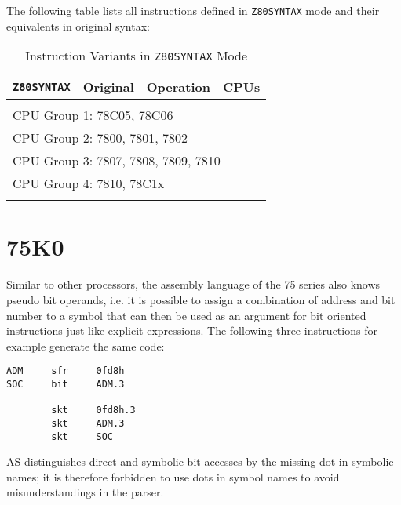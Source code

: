 \documentclass[12pt,twoside]{report}
\newcommand{\asname}{{AS}}
\begin{document}
The following table lists all instructions defined in {\tt Z80SYNTAX}
mode and their equivalents in original syntax:

\begin{longtable}{|l|l|l|l|}
\hline
{\tt Z80SYNTAX} & Original & Operation  & CPUs \\
\hline
\hline
\endhead

\\ \hline
\multicolumn{4}{|l|}{CPU Group 1: 78C05, 78C06} \\
\multicolumn{4}{|l|}{CPU Group 2: 7800, 7801, 7802} \\
\multicolumn{4}{|l|}{CPU Group 3: 7807, 7808, 7809, 7810} \\
\multicolumn{4}{|l|}{CPU Group 4: 7810, 78C1x} \\
\hline
\caption{Instruction Variants in {\tt Z80SYNTAX} Mode}
\end{longtable}


\section{75K0}
\label{75K0Spec}

Similar to other processors, the assembly language of the 75 series
also knows pseudo bit operands, i.e. it is possible to assign a
combination of address and bit number to a symbol that can then be
used as an argument for bit oriented instructions just like explicit
expressions.  The following three instructions for example generate
the same code:
\begin{verbatim}
ADM     sfr     0fd8h
SOC     bit     ADM.3

        skt     0fd8h.3
        skt     ADM.3
        skt     SOC
\end{verbatim}
\asname{} distinguishes direct and symbolic bit accesses by the missing dot
in symbolic names; it is therefore forbidden to use dots in symbol
names to avoid misunderstandings in the parser.
\end{document}
